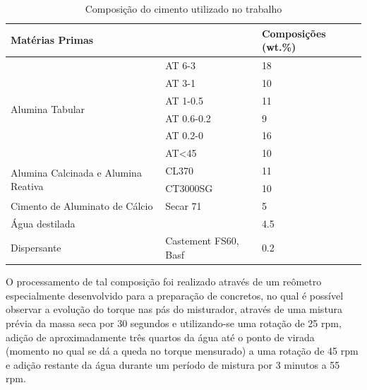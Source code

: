 \begin{table}[]
\centering
\caption{Composição do cimento utilizado no trabalho}
\label{tab:composition}
\begin{tabular}{|l|l|l|}
  \hline
  \multicolumn{2}{|l|}{Matérias Primas}                         & Composições (wt.\%) \\ \hline
  \multirow{6}{*}{Alumina Tabular}               & AT 6-3     & 18                  \\ \cline{2-3} 
                                                                & AT 3-1     & 10                  \\ \cline{2-3} 
                                                                & AT 1-0.5   & 11                  \\ \cline{2-3} 
                                                                & AT 0.6-0.2 & 9                   \\ \cline{2-3} 
                                                                & AT 0.2-0   & 16                  \\ \cline{2-3} 
                                                                & AT<45      & 10                  \\ \hline
  \multirow{2}{*}{Alumina Calcinada e Alumina Reativa} & CL370      & 11                  \\ \cline{2-3} 
                                                                & CT3000SG   & 10                  \\ \hline
  Cimento de Aluminato de Cálcio                       & Secar 71   & 5                   \\ \hline
  Água destilada                                &            & 4.5                 \\ \hline
  Dispersante                &   Castement FS60, Basf         & 0.2                \\ \hline
\end{tabular}
\end{table}

O processamento de tal composição foi realizado através de um reômetro
especialmente desenvolvido para a preparação de concretos, no qual é possível
observar a evolução do torque nas pás do misturador, através de uma mistura
prévia da massa seca por 30 segundos e utilizando-se uma rotação de 25 rpm,
adição de aproximadamente três quartos da água até o ponto de virada (momento no
qual se dá a queda no torque mensurado) a uma rotação de 45 rpm  e adição
restante da água durante um período de mistura por 3  minutos a 55 rpm.

